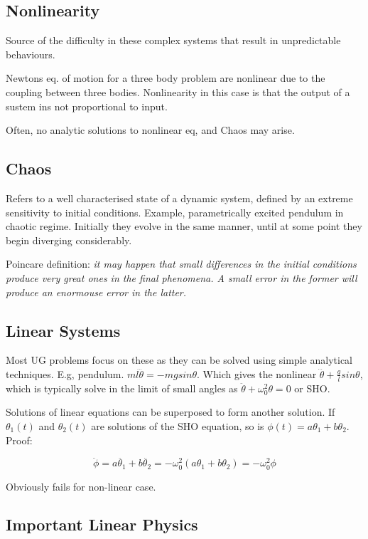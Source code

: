 \documentclass[]{article}
\begin{document}
\subsection{Nonlinearity}

Source of the difficulty in these complex systems that result in unpredictable behaviours.

Newtons eq. of motion for a three body problem are nonlinear due to the coupling between three bodies. Nonlinearity in this case is that the output of a sustem ins not proportional to input.

Often, no analytic solutions to nonlinear eq, and Chaos may arise.

\subsection{Chaos}
Refers to a well characterised state of a dynamic system, defined by an extreme sensitivity to initial conditions. Example, parametrically excited pendulum in chaotic regime. Initially they evolve in the same manner, until at some point they begin diverging considerably.

Poincare definition: \textit{it may happen that small differences in the initial conditions produce very great ones in the final phenomena. A small error in the former will produce an enormouse error in the latter.}

\subsection{Linear Systems}
Most UG problems focus on these as they can be solved using simple analytical techniques. E.g, pendulum. $ml\dddot{\theta} = -mgsin\theta$. Which gives the nonlinear $\dddot{\theta} + \frac{g}{l}sin\theta$, which is typically solve in the limit of small angles as $\ddot{\theta} + \omega_0^2\theta = 0$ or SHO.

Solutions of linear equations can be superposed to form another solution. If $\theta_1(t)$ and $\theta_2(t)$ are solutions of the SHO equation, so is $\phi(t) = a\theta_1 + b\theta_2$. Proof:

\begin{equation}
\ddot{\phi} = a\ddot{\theta_1} + b\ddot{\theta_2} 
= -\omega_0^2(a\theta_1 + b\theta_2) 
= -\omega_0^2\phi
\end{equation} 

Obviously fails for non-linear case.

\subsection{Important Linear Physics}
\end{document}
